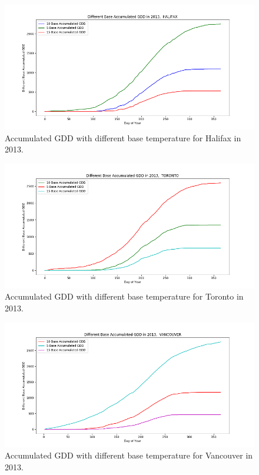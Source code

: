 \documentclass[12pt]{article}
\begin{document}
\begin{center}
\begin{figure}[H]
\includegraphics[width=5.25in]{Plot/differentT_baseforHalifax.png}

\caption{Accumulated GDD with different base temperature for Halifax in 2013.}
\label{5.6}
\end{figure}
\end{center}




\begin{center}
\begin{figure}[H]
\includegraphics[width=5.25in]{Plot/differentT_baseforToronto.png}
\caption{Accumulated GDD with different base temperature for Toronto in 2013.}
\label{5.7}
\end{figure}
\end{center}




\begin{center}
\begin{figure}[H]
\includegraphics[width=5.25in]{Plot/differentT_baseforVancouver.png}
\caption{Accumulated GDD with different base temperature for Vancouver in 2013.}
\label{5.8}
\end{figure}
\end{center}
\end{document}
